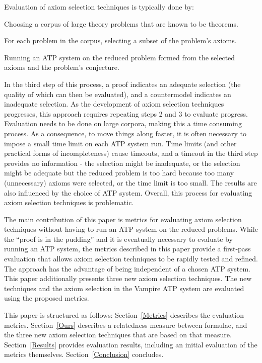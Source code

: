 \documentclass[EPiC]{easychair}
\newenvironment{packed_enumerate}{
\vspace*{-0.5em}
\begin{enumerate}
  \setlength{\partopsep}{0pt}
  \setlength{\itemsep}{1pt}
  \setlength{\parskip}{0pt}
  \setlength{\parsep}{0pt}
}{\end{enumerate}}
\begin{document}
Evaluation of axiom selection techniques is typically done by:
\begin{packed_enumerate}
\item Choosing a corpus of large theory problems that are known to be theorems.
\item For each problem in the corpus, selecting a subset of the problem's
      axioms.
\item Running an ATP system on the reduced problem formed from the selected 
      axioms and the problem's conjecture.
\end{packed_enumerate}
In the third step of this process, a proof indicates an adequate selection
(the quality of which can then be evaluated), and a countermodel indicates 
an inadequate selection. 
As the development of axiom selection techniques progresses, this approach 
requires repeating steps 2 and 3 to evaluate progress.
Evaluation needs to be done on large corpora, making this a time consuming 
process.
As a consequence, to move things along faster, it is often necessary to impose 
a small time limit on each ATP system run.
Time limits (and other practical forms of incompleteness) cause timeouts, and 
a timeout in the third step provides no information - the selection might be 
inadequate, or the selection might be adequate but the reduced problem is 
too hard because too many (unnecessary) axioms were selected, or the time 
limit is too small.
The results are also influenced by the choice of ATP system.
Overall, this process for evaluating axiom selection techniques is problematic.

The main contribution of this paper is metrics for evaluating axiom selection 
techniques without having to run an ATP system on the reduced problems.
While the ``proof is in the pudding'' and it is eventually necessary to
evaluate by running an ATP system, the metrics described in this paper
provide a first-pass evaluation that allows axiom selection techniques to
be rapidly tested and refined.
The approach has the advantage of being independent of a chosen ATP system.
This paper additionally presents three new axiom selection techniques. 
The new techniques and the axiom selection \cite{HV11} in the Vampire 
\cite{KV13} 
ATP system are evaluated using the proposed metrics.

This paper is structured as follows:
Section~\ref{Metrics} describes the evaluation metrics.
Section~\ref{Ours} describes a relatedness measure between formulae, and
the three new axiom selection techniques that are based on that measure.
Section~\ref{Results} provides evaluation results, including an initial 
evaluation of the metrics themselves.
Section~\ref{Conclusion} concludes.
\end{document}
